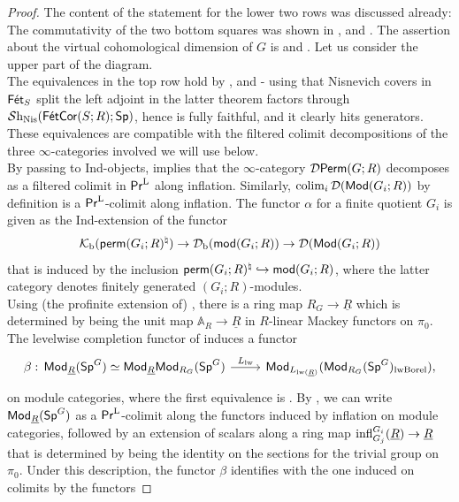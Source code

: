 \documentclass[reqno]{amsart}
\numberwithin{equation}{section}\theoremstyle{thms}
\theoremstyle{defn}
\newcommand{\bA}{\mathbb{A}}
\newcommand{\cD}{\mathcal{D}}
\newcommand{\cK}{\mathcal{K}}
\newcommand{\tn}[1]{\textnormal{#1}}
\newcommand{\tsf}[1]{\textsf{\textup{#1}}}
\newcommand{\mcal}[1]{\mathcal{#1}}
\newcommand{\underl}[1]{\underline{#1}}
\newcommand{\sheaves}{\mcal{S}\tn{h}}
\newcommand{\Mod}{\tsf{Mod}}
\newcommand{\spec}{\tsf{Sp}}
\newcommand{\specg}{\tsf{Sp}^G}
\newcommand{\prl}{\tsf{Pr}^{\tn{L}}}
\newcommand{\Perm}{\tsf{Perm}}
\newcommand{\fets}{\tsf{Fét}_S}
\newcommand{\corfets}[1]{\tsf{FétCor}(S;#1)}
\begin{document}
\begin{proof}
The content of the statement for the lower two rows was discussed already: The commutativity of the two bottom squares was shown in ,  and . The assertion about the virtual cohomological dimension of $G$ is  and . Let us consider the upper part of the diagram. \\
The equivalences in the top row hold by \cite[Corollary 4.8, Corollary 3.18]{fuh25}, \cite[Example 2.15]{bcn25} and  - using that Nisnevich covers in $\fets$ split the left adjoint in the latter theorem factors through $\sheaves_{\tn{Nis}}(\corfets{R};\spec)$, hence is fully faithful, and it clearly hits generators. These equivalences are compatible with the filtered colimit decompositions of the three $\infty$-categories involved we will use below. \\
By passing to Ind-objects, \cite[Proposition 2.4]{bg25b} implies that the $\infty$-category $\cD\Perm(G;R)$ decomposes as a filtered colimit in $\prl$ along inflation. Similarly, $\tn{colim}_i \, \cD(\Mod(G_i;R))$ by definition is a $\prl$-colimit along inflation. The functor $\alpha$ for a finite quotient $G_i$ is given as the Ind-extension of the functor
$$\cK_{\tn{b}}(\tsf{perm}(G_i;R)^\natural) \to \cD_{\tn{b}}(\tsf{mod}(G_i;R)) \to \cD(\tsf{Mod}(G_i;R))$$
that is induced by the inclusion $\tsf{perm}(G_i;R)^\natural \hookrightarrow \tsf{mod}(G_i;R)$, where the latter category denotes finitely generated $(G_i;R)$-modules.\\
Using (the profinite extension of) \cite[§5.2]{gs14}, there is a ring map $R_G \to \underl{R}$ which is determined by being the unit map $\bA_R \to \underl{R}$ in $R$-linear Mackey functors on $\pi_0$. The levelwise completion functor of  induces a functor
\[\begin{tikzcd}
	{\beta: \, \Mod_{\underl{R}}(\specg) \simeq \Mod_{\underl{R}}\Mod_{R_G}(\specg)} & {\Mod_{L_{\tn{lw}(\underl{R})}}(\Mod_{R_G}(\specg)_{\tn{lwBorel}}),}
	\arrow["{L_{\tn{lw}}}", from=1-1, to=1-2]
\end{tikzcd}\]
on module categories, where the first equivalence is \cite[Corollary 3.4.1.9]{lur17}. By \cite[Construction 3.8, p.39]{fuh25}, we can write $\Mod_{\underl{R}}(\specg)$ as a $\prl$-colimit along the functors induced by inflation on module categories, followed by an extension of scalars along a ring map $\tn{infl}_{G_j}^{G_i}(\underl{R})\to \underl{R}$ that is determined by being the identity on the sections for the trivial group on $\pi_0$. Under this description, the functor $\beta$ identifies with the one induced on colimits by the functors

\end{proof}
\end{document}
